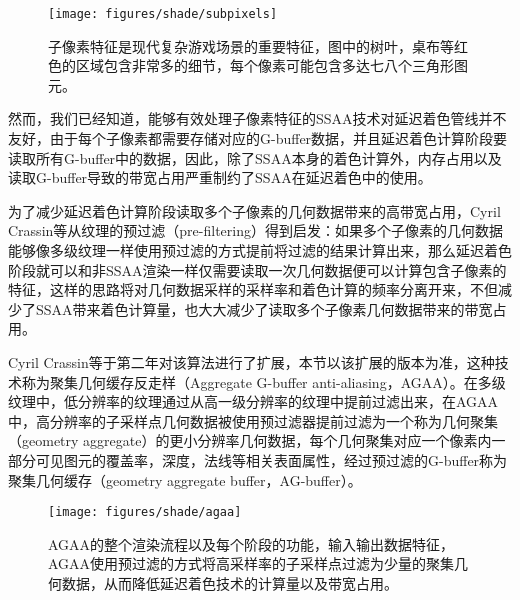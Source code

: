 \begin{figure}
\begin{fullwidth}
	\texttt{[image: figures/shade/subpixels]}
	\caption{子像素特征是现代复杂游戏场景的重要特征，图中的树叶，桌布等红色的区域包含非常多的细节，每个像素可能包含多达七八个三角形图元。}
	\label{f:shade-subpixels}
\end{fullwidth}
\end{figure}

然而，我们已经知道，能够有效处理子像素特征的SSAA技术对延迟着色管线并不友好，由于每个子像素都需要存储对应的G-buffer数据，并且延迟着色计算阶段要读取所有G-buffer中的数据，因此，除了SSAA本身的着色计算外，内存占用以及读取G-buffer导致的带宽占用严重制约了SSAA在延迟着色中的使用。

为了减少延迟着色计算阶段读取多个子像素的几何数据带来的高带宽占用，Cyril Crassin\cite{a:AggregateG-BufferAnti-Aliasing}等从纹理的预过滤（pre-filtering）得到启发：如果多个子像素的几何数据能够像多级纹理一样使用预过滤的方式提前将过滤的结果计算出来，那么延迟着色阶段就可以和非SSAA渲染一样仅需要读取一次几何数据便可以计算包含子像素的特征，这样的思路将对几何数据采样的采样率和着色计算的频率分离开来，不但减少了SSAA带来着色计算量，也大大减少了读取多个子像素几何数据带来的带宽占用。

Cyril Crassin等于第二年\cite{a:AggregateG-BufferAnti-Aliasing-ExtendedVersion-}对该算法进行了扩展，本节以该扩展的版本为准，这种技术称为聚集几何缓存反走样（Aggregate G-buffer anti-aliasing，AGAA）。在多级纹理中，低分辨率的纹理通过从高一级分辨率的纹理中提前过滤出来，在AGAA中，高分辨率的子采样点几何数据被使用预过滤器提前过滤为一个称为几何聚集（geometry aggregate）的更小分辨率几何数据，每个几何聚集对应一个像素内一部分可见图元的覆盖率，深度，法线等相关表面属性，经过预过滤的G-buffer称为聚集几何缓存（geometry aggregate buffer，AG-buffer）。

\begin{figure}
\begin{fullwidth}
	\texttt{[image: figures/shade/agaa]}		
	\caption{AGAA的整个渲染流程以及每个阶段的功能，输入输出数据特征，AGAA使用预过滤的方式将高采样率的子采样点过滤为少量的聚集几何数据，从而降低延迟着色技术的计算量以及带宽占用。}
	\label{f:shade-agaa}
\end{fullwidth}
\end{figure}


